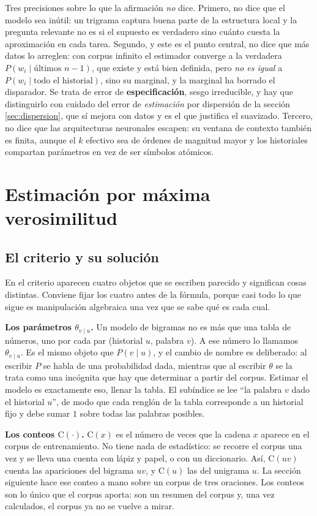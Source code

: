 \documentclass[11pt,letterpaper]{article}
\newcommand{\Count}{\mathrm{C}}
\begin{document}
Tres precisiones sobre lo que la afirmación \emph{no} dice. Primero, no dice que
el modelo sea inútil: un trigrama captura buena parte de la estructura local y
la pregunta relevante no es si el supuesto es verdadero sino cuánto cuesta la
aproximación en cada tarea. Segundo, y este es el punto central, no dice que más
datos lo arreglen: con corpus infinito el estimador converge a la verdadera
$P(w_i\mid \text{últimos } n-1)$, que existe y está bien definida, pero \emph{no
es igual} a $P(w_i\mid \text{todo el historial})$, sino su marginal, y la
marginal ha borrado el disparador. Se trata de error de \textbf{especificación},
sesgo irreducible, y hay que distinguirlo con cuidado del error de
\emph{estimación} por dispersión de la sección \ref{sec:dispersion}, que sí
mejora con datos y es el que justifica el suavizado. Tercero, no dice que las
arquitecturas neuronales escapen: su ventana de contexto también es finita,
aunque el $k$ efectivo sea de órdenes de magnitud mayor y los historiales
compartan parámetros en vez de ser símbolos atómicos.

\section{Estimación por máxima verosimilitud}\label{sec:mle}

\subsection{El criterio y su solución}

En el criterio aparecen cuatro objetos que se escriben parecido y
significan cosas distintas. Conviene fijar los cuatro antes de la
fórmula, porque casi todo lo que sigue es manipulación algebraica una
vez que se sabe qué es cada cual.

\textbf{Los parámetros $\theta_{v\mid u}$.} Un modelo de bigramas no es
más que una tabla de números, uno por cada par (historial $u$, palabra
$v$). A ese número lo llamamos $\theta_{v\mid u}$. Es el mismo objeto
que $P(v\mid u)$, y el cambio de nombre es deliberado: al escribir $P$
se habla de una probabilidad dada, mientras que al escribir $\theta$ se
la trata como una incógnita que hay que determinar a partir del corpus.
Estimar el modelo es exactamente eso, llenar la tabla. El subíndice se
lee ``la palabra $v$ dado el historial $u$'', de modo que cada renglón
de la tabla corresponde a un historial fijo y debe sumar $1$ sobre
todas las palabras posibles.

\textbf{Los conteos $\Count(\cdot)$.} $\Count(x)$ es el número de veces
que la cadena $x$ aparece en el corpus de entrenamiento. No tiene nada
de estadístico: se recorre el corpus una vez y se lleva una cuenta con
lápiz y papel, o con un diccionario. Así, $\Count(uv)$ cuenta las
apariciones del bigrama $uv$, y $\Count(u)$ las del unigrama $u$. La
sección siguiente hace ese conteo a mano sobre un corpus de tres
oraciones. Los conteos son lo único que el corpus aporta: son un
resumen del corpus y, una vez calculados, el corpus ya no se vuelve a
mirar.
\end{document}
